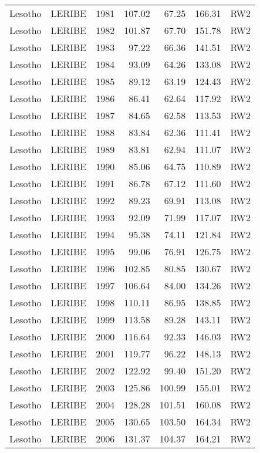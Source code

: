 \begin{longtable}{lllrrrl}
  Lesotho & LERIBE & 1981 & 107.02 & 67.25 & 166.31 & RW2 \\ 
  Lesotho & LERIBE & 1982 & 101.87 & 67.70 & 151.78 & RW2 \\ 
  Lesotho & LERIBE & 1983 & 97.22 & 66.36 & 141.51 & RW2 \\ 
  Lesotho & LERIBE & 1984 & 93.09 & 64.26 & 133.08 & RW2 \\ 
  Lesotho & LERIBE & 1985 & 89.12 & 63.19 & 124.43 & RW2 \\ 
  Lesotho & LERIBE & 1986 & 86.41 & 62.64 & 117.92 & RW2 \\ 
  Lesotho & LERIBE & 1987 & 84.65 & 62.58 & 113.53 & RW2 \\ 
  Lesotho & LERIBE & 1988 & 83.84 & 62.36 & 111.41 & RW2 \\ 
  Lesotho & LERIBE & 1989 & 83.81 & 62.94 & 111.07 & RW2 \\ 
  Lesotho & LERIBE & 1990 & 85.06 & 64.75 & 110.89 & RW2 \\ 
  Lesotho & LERIBE & 1991 & 86.78 & 67.12 & 111.60 & RW2 \\ 
  Lesotho & LERIBE & 1992 & 89.23 & 69.91 & 113.08 & RW2 \\ 
  Lesotho & LERIBE & 1993 & 92.09 & 71.99 & 117.07 & RW2 \\ 
  Lesotho & LERIBE & 1994 & 95.38 & 74.11 & 121.84 & RW2 \\ 
  Lesotho & LERIBE & 1995 & 99.06 & 76.91 & 126.75 & RW2 \\ 
  Lesotho & LERIBE & 1996 & 102.85 & 80.85 & 130.67 & RW2 \\ 
  Lesotho & LERIBE & 1997 & 106.64 & 84.00 & 134.26 & RW2 \\ 
  Lesotho & LERIBE & 1998 & 110.11 & 86.95 & 138.85 & RW2 \\ 
  Lesotho & LERIBE & 1999 & 113.58 & 89.28 & 143.11 & RW2 \\ 
  Lesotho & LERIBE & 2000 & 116.64 & 92.33 & 146.03 & RW2 \\ 
  Lesotho & LERIBE & 2001 & 119.77 & 96.22 & 148.13 & RW2 \\ 
  Lesotho & LERIBE & 2002 & 122.92 & 99.40 & 151.20 & RW2 \\ 
  Lesotho & LERIBE & 2003 & 125.86 & 100.99 & 155.01 & RW2 \\ 
  Lesotho & LERIBE & 2004 & 128.28 & 101.51 & 160.08 & RW2 \\ 
  Lesotho & LERIBE & 2005 & 130.65 & 103.50 & 164.34 & RW2 \\ 
  Lesotho & LERIBE & 2006 & 131.37 & 104.37 & 164.21 & RW2 \\ 

\end{longtable}
